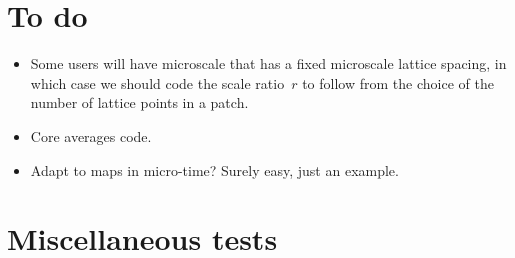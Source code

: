 


\begin{devMan}



\end{devMan}









\begin{devMan}

\section{To do}
\begin{itemize}
\item Some users will have microscale that has a fixed
microscale lattice spacing, in which case we should code the
scale ratio~\(r\) to follow from the choice of the number of
lattice points in a patch.
\item Core averages code.
\item Adapt to maps in micro-time?  Surely easy, just an example.
\end{itemize}


\section{Miscellaneous tests}




\end{devMan}

